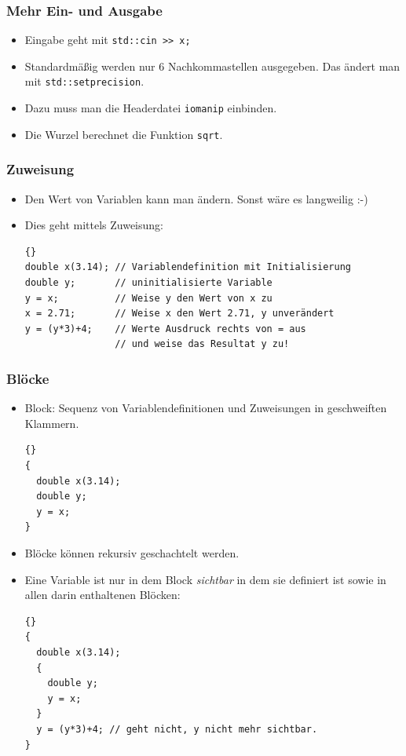 \begin{frame}[fragile]
\frametitle{Mehr Ein- und Ausgabe}

\begin{itemize}
\item Eingabe geht mit \lstinline{std::cin >> x;}
\item Standardmäßig werden nur 6 Nachkommastellen ausgegeben. Das
  ändert man mit \lstinline{std::setprecision}.
\item Dazu muss man die Headerdatei \lstinline{iomanip} einbinden.
\item Die Wurzel berechnet die Funktion \lstinline{sqrt}.
\end{itemize}
\end{frame}

\begin{frame}[fragile]
\frametitle{Zuweisung}
\begin{itemize}
\item Den Wert von Variablen kann man ändern. Sonst wäre es langweilig
  :-)
\item Dies geht mittels Zuweisung:
{\scriptsize\begin{lstlisting}{}
double x(3.14); // Variablendefinition mit Initialisierung
double y;       // uninitialisierte Variable
y = x;          // Weise y den Wert von x zu
x = 2.71;       // Weise x den Wert 2.71, y unverändert
y = (y*3)+4;    // Werte Ausdruck rechts von = aus
                // und weise das Resultat y zu!
\end{lstlisting}}
\end{itemize}
\end{frame}

\begin{frame}[fragile]
\frametitle{Blöcke}
\begin{itemize}
\item Block: Sequenz von Variablendefinitionen und Zuweisungen in
  geschweiften Klammern.
{\scriptsize\begin{lstlisting}{}
{
  double x(3.14);
  double y;
  y = x;
}
\end{lstlisting}}
\item Blöcke können rekursiv geschachtelt werden.
\item Eine Variable ist nur in dem Block \textsl{sichtbar} in dem sie
  definiert ist sowie in allen darin enthaltenen Blöcken:
{\scriptsize\begin{lstlisting}{}
{
  double x(3.14);
  {
    double y;
    y = x;
  }
  y = (y*3)+4; // geht nicht, y nicht mehr sichtbar.
}
\end{lstlisting}}
\end{itemize}
\end{frame}

